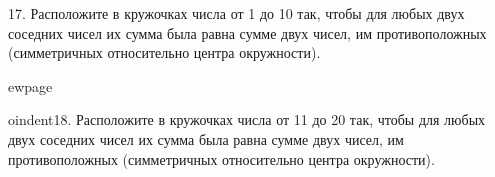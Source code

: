 17. Расположите в кружочках числа от 1 до 10 так, чтобы для любых двух соседних чисел их сумма была равна сумме двух чисел, им противоположных (симметричных относительно центра окружности).
\begin{center}
\begin{figure}[ht!]
\end{figure}
\end{center}

ewpage

oindent18. Расположите в кружочках числа от 11 до 20 так, чтобы для любых двух соседних чисел их сумма была равна сумме двух чисел, им противоположных (симметричных относительно центра окружности).
\begin{center}
\begin{figure}[ht!]
\end{figure}
\end{center}
